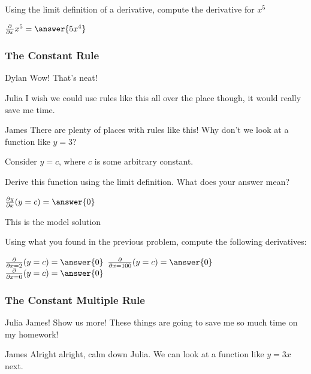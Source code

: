\documentclass{ximera}
\begin{document}
\begin{question}
Using the limit definition of a derivative, compute the derivative for $x^5$

$ \frac{\partial}{\partial x} x^5 =  \answer{5x^4}$
\end{question}

\subsubsection{The Constant Rule}
\begin{dialogue}
\item[Dylan] Wow! That's neat!
\item[Julia] I wish we could use rules like this all over the place though, it would really save me time.
\item[James] There are plenty of places with rules like this! Why don't we look at a function like $y = 3$?
\end{dialogue}

Consider $y = c$, where $c$ is some arbitrary constant.
\begin{question}
Derive this function using the limit definition. What does your answer mean?

$ \frac{\partial y}{\partial x} (y=c) =  \answer{0}$
\begin{freeResponse}
This is the model solution %
\end{freeResponse}
\end{question}

\begin{question}
Using what you found in the previous problem, compute the following derivatives:

$ \frac{\partial}{\partial x=2}(y=c) =  \answer{0}$
$ \frac{\partial}{\partial x=100}(y=c) =  \answer{0}$
$ \frac{\partial}{\partial x=0}(y=c) =  \answer{0}$
\end{question}

\subsubsection{The Constant Multiple Rule}
\begin{dialogue}
\item[Julia] James! Show us more! These things are going to save me so much time on my homework!
\item[James] Alright alright, calm down Julia. We can look at a function like $y = 3x$ next.
\end{dialogue}
\end{document}
